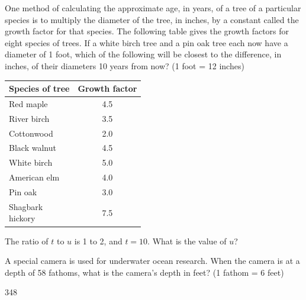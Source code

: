 \question[1]
One method of calculating the approximate age, in years, of a tree of a particular species is to multiply the diameter of the tree, in inches, by a constant called the growth factor for that species. The following table gives the growth factors for eight species of trees. If a white birch tree and a pin oak tree each now have a diameter of 1 foot, which of the following will be closest to the difference, in inches, of their diameters 10 years from now? (1 foot = 12 inches)
\begin{center}
  \renewcommand{\arraystretch}{1.3}
  \setlength{\tabcolsep}{0.5em}
  \label{tab:sat-drill-07-tree-growth-factors}%
  \vspace{0.35em}
  \begin{adjustbox}{max width=\linewidth,clip=false,margin=0pt}
  \begin{tabular}{|l|c|} 
    \hline
    \cellcolor[HTML]{E0E0E0}\textbf{Species of tree} &
    \cellcolor[HTML]{E0E0E0}\textbf{Growth factor} \\
    \hline
    Red maple & 4.5 \\
    \hline
    River birch & 3.5 \\
    \hline
    Cottonwood & 2.0 \\
    \hline
    Black walnut & 4.5 \\
    \hline
    White birch & 5.0 \\
    \hline
    American elm & 4.0 \\
    \hline
    Pin oak & 3.0 \\
    \hline
    \makecell[l]{Shagbark\\hickory} & 7.5 \\
    \hline
  \end{tabular}
  \end{adjustbox}
\end{center}
\begin{choices}
\end{choices}

\question[1]
The ratio of $t$ to $u$ is 1 to 2, and $t=10$. What is the value of $u$?
\begin{choices}
\end{choices}


\newpage


\question[1]
A special camera is used for underwater ocean research. When the camera is at a depth of 58 fathoms, what is the camera's depth in feet? (1 fathom = 6 feet)
\begin{solution}
348
\end{solution}

